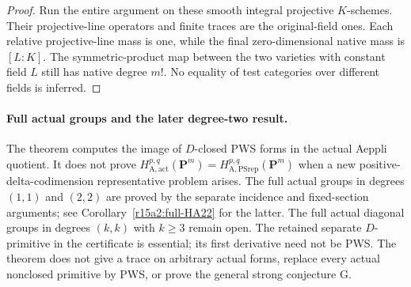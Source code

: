 \begin{proof}
Run the entire argument on these smooth integral projective
$K$-schemes. Their projective-line operators and finite traces
are the original-field ones. Each relative projective-line
mass is one, while the final zero-dimensional native mass is
$[L:K]$. The symmetric-product map between the two varieties
with constant field $L$ still has native degree $m!$.
No equality of test categories over different fields is inferred.
\end{proof}

\paragraph{Full actual groups and the later degree-two result.}
The theorem computes the image of $D$-closed PWS forms in
the actual Aeppli quotient. It does not prove
$H_{\mathrm A,\mathrm{act}}^{p,q}(\mathbf P^m)
 =H_{\mathrm A,\mathrm{PSrep}}^{p,q}(\mathbf P^m)$
when a new positive-delta-codimension representative problem
arises. The full actual groups in degrees $(1,1)$ and
$(2,2)$ are proved by the separate incidence and
fixed-section arguments; see Corollary~\ref{r15a2:full-HA22}
for the latter. The full actual diagonal groups in degrees
$(k,k)$ with $k\geq3$ remain open. The retained separate
$D$-primitive in the certificate is essential; its first
derivative need not be PWS. The theorem does not give a trace
on arbitrary actual forms, replace every actual nonclosed
primitive by PWS, or prove the general strong conjecture G.

